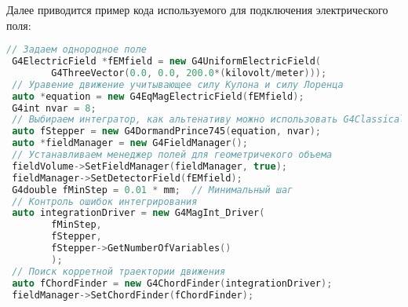 Далее приводится пример кода используемого для подключения электрического поля:
\begin{lstlisting}[language=C++]
 // Задаем однородное поле
 G4ElectricField *fEMfield = new G4UniformElectricField(
        G4ThreeVector(0.0, 0.0, 200.0*(kilovolt/meter)));
 // Уравение движение учитывающее силу Кулона и силу Лоренца
 auto *equation = new G4EqMagElectricField(fEMfield);
 G4int nvar = 8;
 // Выбираем интегратор, как альтенативу можно использовать G4ClassicalRK4
 auto fStepper = new G4DormandPrince745(equation, nvar);
 auto *fieldManager = new G4FieldManager();
 // Устанавливаем менеджер полей для геометричекого объема
 fieldVolume->SetFieldManager(fieldManager, true); 
 fieldManager->SetDetectorField(fEMfield);
 G4double fMinStep = 0.01 * mm;  // Минимальный шаг
 // Контроль ошибок интегрирования
 auto integrationDriver = new G4MagInt_Driver(
        fMinStep,
        fStepper,
        fStepper->GetNumberOfVariables()
        );
 // Поиск корретной траектории движения
 auto fChordFinder = new G4ChordFinder(integrationDriver);
 fieldManager->SetChordFinder(fChordFinder);
\end{lstlisting}
